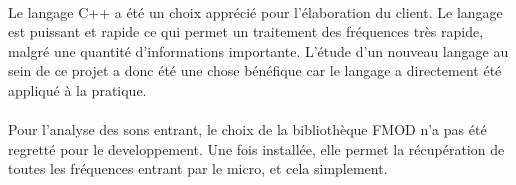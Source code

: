 \paragraph{}
Le langage C++ a été un choix apprécié pour l'élaboration du client. Le langage est puissant et rapide ce qui permet un 
traitement des fréquences très rapide, malgré une quantité d'informations importante. L'étude d'un nouveau langage au sein 
de ce projet a donc été une chose bénéfique car le langage a directement été appliqué à la pratique.

\paragraph{}
Pour l'analyse des sons entrant, le choix de la bibliothèque FMOD n'a pas été regretté pour le developpement. Une fois installée, 
elle permet la récupération de toutes les fréquences entrant par le micro, et cela simplement.

